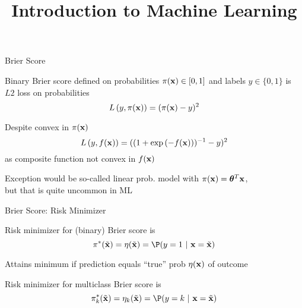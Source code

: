 \documentclass[11pt,compress,t,notes=noshow, xcolor=table]{beamer}
\title{Introduction to Machine Learning}
\begin{document}
    


\begin{framei}[fs=footnotesize,sep=M]{Brier Score}

\item Binary Brier score defined on probabilities $\pi(\mathbf{x}) \in [0, 1]$ and labels $y \in \{0, 1\}$ is $L2$ loss on probabilities $$L\left(y, \pi(\mathbf{x})\right) = (\pi(\mathbf{x}) - y)^2$$
\item Despite convex in $\pi(\mathbf{x})$ $$L\left(y, f(\mathbf{x})\right)=((1+\exp{(-f(\mathbf{x}))})^{-1}-y)^2$$ as composite function not convex in $f(\mathbf{x})$
\item Exception would be so-called linear prob. model with $\pi(\mathbf{x}) = \bm{\theta}^T \mathbf{x}$,\\
but that is quite uncommon in ML 

\vfill 


\end{framei}

\begin{framei}[sep=L]{Brier Score: Risk Minimizer}

    \item Risk minimizer for (binary) Brier score is $$\piastxtil = \eta(\xtil) = \P(y=1~|~\xv = \xtil)$$
    \item Attains minimum if prediction equals \enquote{true} prob $\eta(\mathbf{x})$ of outcome
    \item Risk minimizer for multiclass Brier score is 
$$\pi^{\ast}_k(\xtil) = \eta_k(\xtil) =  \P(y = k ~|~ \xv = \xtil) $$

\end{framei}
\end{document}
